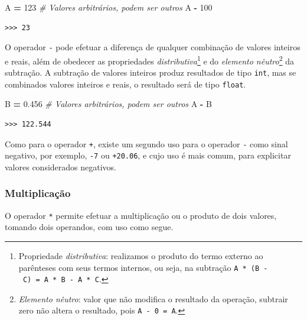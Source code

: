 \documentclass[
]{book}
\newenvironment{Shaded}{\begin{snugshade}}{\end{snugshade}}
\newcommand{\CommentTok}[1]{\textcolor[rgb]{0.56,0.35,0.01}{\textit{#1}}}
\newcommand{\DecValTok}[1]{\textcolor[rgb]{0.00,0.00,0.81}{#1}}
\newcommand{\FloatTok}[1]{\textcolor[rgb]{0.00,0.00,0.81}{#1}}
\newcommand{\NormalTok}[1]{#1}
\newcommand{\OperatorTok}[1]{\textcolor[rgb]{0.81,0.36,0.00}{\textbf{#1}}}
\begin{document}
\begin{Shaded}
\begin{Highlighting}[]
\NormalTok{A }\OperatorTok{=} \DecValTok{123} \CommentTok{\# Valores arbitrários, podem ser outros}
\NormalTok{A }\OperatorTok{{-}} \DecValTok{100}
\end{Highlighting}
\end{Shaded}

\begin{verbatim}
>>> 23
\end{verbatim}

O operador \texttt{-} pode efetuar a diferença de qualquer combinação de valores inteiros e reais, além de obedecer as propriedades \emph{distributiva}\footnote{Propriedade \emph{distributiva}: realizamos o produto do termo externo ao parênteses com seus termos internos, ou seja, na subtração \texttt{A\ *\ (B\ -\ C)\ =\ A\ *\ B\ -\ A\ *\ C}.} e do \emph{elemento nêutro}\footnote{\emph{Elemento nêutro}: valor que não modifica o resultado da operação, subtrair zero não altera o resultado, pois \texttt{A\ -\ 0\ =\ A}.} da subtração. A subtração de valores inteiros produz resultados de tipo \texttt{int}, mas se combinados valores inteiros e reais, o resultado será de tipo \texttt{float}.

\begin{Shaded}
\begin{Highlighting}[]
\NormalTok{B }\OperatorTok{=} \FloatTok{0.456} \CommentTok{\# Valores arbitrários, podem ser outros}
\NormalTok{A }\OperatorTok{{-}}\NormalTok{ B}
\end{Highlighting}
\end{Shaded}

\begin{verbatim}
>>> 122.544
\end{verbatim}

Como para o operador \texttt{+}, existe um segundo uso para o operador \texttt{-} como sinal negativo, por exemplo, \texttt{-7} ou \texttt{+20.06}, e cujo uso é mais comum, para explicitar valores considerados negativos.

\hypertarget{multiplicauxe7uxe3o}{%
\subsubsection{Multiplicação}\label{multiplicauxe7uxe3o}}

O operador \texttt{*} permite efetuar a multiplicação ou o produto de dois valores, tomando dois operandos, com uso como segue.
\end{document}
